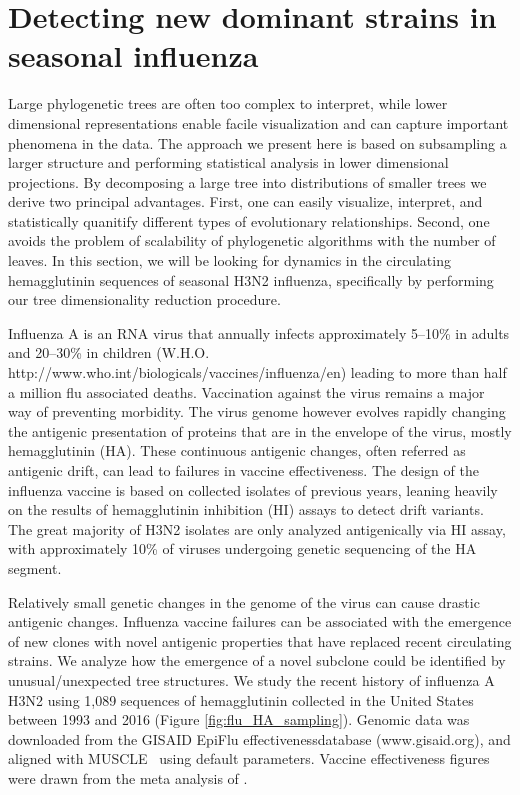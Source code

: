 \documentclass[a4paper,11pt]{article}
\begin{document}
\section{Detecting new dominant strains in seasonal influenza}\label{sec:flu}

Large phylogenetic trees are often too complex to interpret, while lower dimensional representations enable facile visualization and can capture important phenomena in the data.
The approach we present here is based on subsampling a larger structure and performing statistical analysis in lower dimensional projections.
By decomposing a large tree into distributions of smaller trees we derive two principal advantages.
First, one can easily visualize, interpret, and statistically quanitify different types of evolutionary relationships.
Second, one avoids the problem of scalability of phylogenetic algorithms with the number of leaves.
In this section, we will be looking for dynamics in the circulating hemagglutinin sequences of seasonal H3N2 influenza, specifically by performing our tree dimensionality reduction procedure.

Influenza A is an RNA virus that annually infects approximately 5--10\% in adults and 20--30\% in children (W.H.O. http://www.who.int/biologicals/vaccines/influenza/en) leading to more than half a million flu associated deaths.
Vaccination against the virus remains a major way of preventing morbidity.
The virus genome however evolves rapidly changing the antigenic presentation of proteins that are in the envelope of the virus, mostly hemagglutinin (HA).
These continuous antigenic changes, often referred as antigenic drift, can lead to failures in vaccine effectiveness.
The design of the influenza vaccine is based on collected isolates of previous years, leaning heavily on the results of hemagglutinin inhibition (HI) assays to detect drift variants.
The great majority of H3N2 isolates are only analyzed antigenically via HI assay, with approximately 10\% of viruses undergoing genetic sequencing of the HA segment.~\cite{russell2008influenza}

Relatively small genetic changes in the genome of the virus can cause drastic antigenic changes.
Influenza vaccine failures can be associated with the emergence of new clones with novel antigenic properties that have replaced recent circulating strains.
We analyze how the emergence of a novel subclone could be identified by unusual/unexpected tree structures.
We study the recent history of influenza A H3N2 using 1,089 sequences of hemagglutinin collected in the United States between 1993 and 2016 (Figure \ref{fig:flu_HA_sampling}).
Genomic data was downloaded from the GISAID EpiFlu effectivenessdatabase (www.gisaid.org), and aligned with MUSCLE~\cite{edgar2004muscle} using default parameters.
Vaccine effectiveness figures were drawn from the meta analysis of \cite{gupta2006quantifying}.
\end{document}

